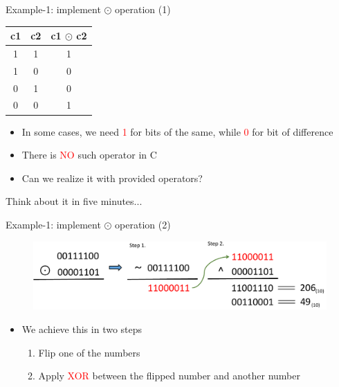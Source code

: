 \begin{frame}{Example-1: implement $\odot$ operation (1)}
\begin{table}
\begin{center}
\begin{tabular}{|c|c|c|}
\hline
c1 & c2 & c1 $\odot$ c2 \\ \hline \hline
1 & 1 & 1 \\ \hline
1 & 0 & 0 \\ \hline
0 & 1 & 0 \\ \hline
0 & 0 & 1 \\ \hline
\end{tabular}
\end{center}
\end{table}
\begin{itemize}
	\item {In some cases, we need \textcolor{red}{1} for bits of the same, while \textcolor{red}{0} for bit of difference}
	\item {There is \textcolor{red}{NO} such operator in C}
	\item {Can we realize it with provided operators?}
\end{itemize}
\begin{center}
	\Large{Think about it in five minutes...}
\end{center}

\end{frame}

\begin{frame}{Example-1: implement $\odot$ operation (2)}
\begin{figure}
\begin{center}
	\includegraphics[width=0.95\linewidth]{figs/hor.pdf}
\end{center}
\end{figure}
\begin{itemize}
	\item {We achieve this in two steps}
	\begin{enumerate}
		\item {Flip one of the numbers}
		\item {Apply \textcolor{red}{XOR} between the flipped number and another number}
	\end{enumerate}
\end{itemize}
\end{frame}

